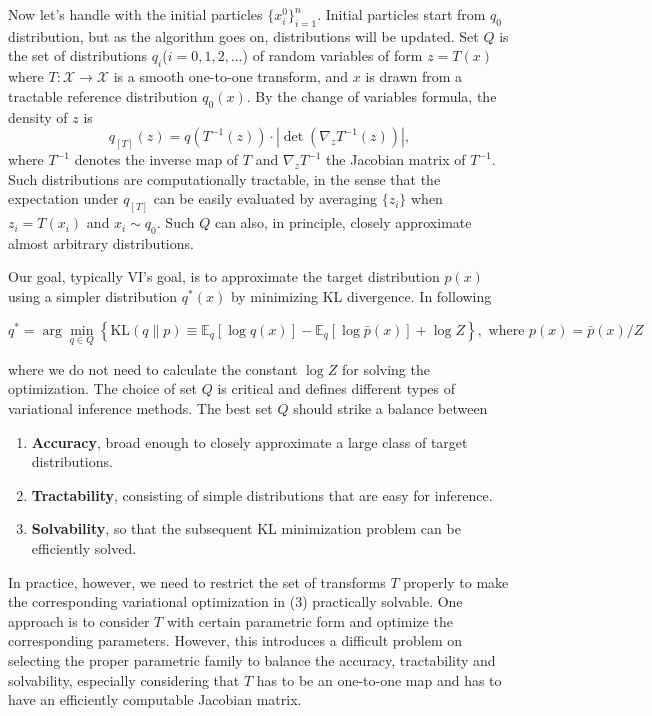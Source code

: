 \documentclass{article}
\begin{document}
Now let's handle with the initial particles $\{x_i^0\}_{i=1}^n$. Initial particles start from $q_{0}$ distribution, but as the algorithm goes on, 
 distributions will be updated. Set \( Q \) is the set of distributions $q_{i}$($i=0,1,2,...$) of random variables of form \( z = T(x) \) where \( T : \mathcal{X} \to \mathcal{X} \) is a smooth one-to-one transform, and \( x \) is drawn from a tractable reference distribution \( q_0(x) \). By the change of variables formula, the density of \( z \) is
\[
q_{[T]}(z) = q(T^{-1}(z)) \cdot \left| \det \left( \nabla_z T^{-1}(z) \right) \right|,
\]
where \( T^{-1} \) denotes the inverse map of \( T \) and \( \nabla_z T^{-1} \) the Jacobian matrix of \( T^{-1} \). Such distributions are computationally tractable, in the sense that the expectation under \( q_{[T]} \) can be easily evaluated by averaging \( \{z_i\} \) when \( z_i = T(x_i) \) and \( x_i \sim q_0 \). Such \( Q \) can also, in principle, closely approximate almost arbitrary distributions. 

Our goal, typically VI's goal, is to approximate the target distribution $p(x)$ using a simpler distribution $q^{*}(x)$ by minimizing KL divergence. In following

\begin{equation}
q^* = \arg \min_{q \in Q} \left\{ \mathrm{KL}(q \parallel p) \equiv \mathbb{E}_q[\log q(x)] - \mathbb{E}_q[\log \bar{p}(x)] + \log Z \right\}, \text{ where }   p(x)=\bar{p}(x)/Z
\end{equation}

where we do not need to calculate the constant \( \log Z \) for solving the optimization. The choice of set \( Q \) is critical and defines different types of variational inference methods. The best set \( Q \) should strike a balance between 
\begin{enumerate}
    \item \textbf{Accuracy},
    broad enough to closely approximate a large class of target distributions.
    \item \textbf{Tractability}, consisting of simple distributions that are easy for inference.
    \item  \textbf{Solvability}, so that the subsequent KL minimization problem can be efficiently solved.
\end{enumerate}


In practice, however, we need to restrict the set of transforms \( T \) properly to make the corresponding variational optimization in (3) practically solvable. One approach is to consider \( T \) with certain parametric form and optimize the corresponding parameters. However, this introduces a difficult problem on selecting the proper parametric family to balance the accuracy, tractability and solvability, especially considering that \( T \) has to be an one-to-one map and has to have an efficiently computable Jacobian matrix.\\
\end{document}
